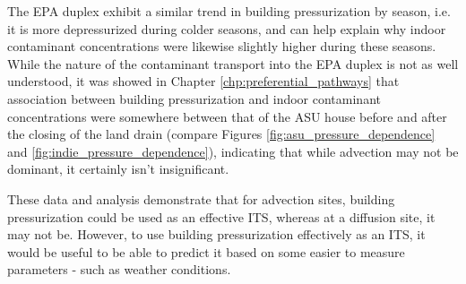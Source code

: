 The EPA duplex exhibit a similar trend in building pressurization by season, i.e. it is more depressurized during colder seasons, and can help explain why indoor contaminant concentrations were likewise slightly higher during these seasons.
While the nature of the contaminant transport into the EPA duplex is not as well understood, it was showed in Chapter \ref{chp:preferential_pathways} that association between building pressurization and indoor contaminant concentrations were somewhere between that of the ASU house before and after the closing of the land drain (compare Figures \ref{fig:asu_pressure_dependence} and \ref{fig:indie_pressure_dependence}), indicating that while advection may not be dominant, it certainly isn't insignificant.\par

These data and analysis demonstrate that for advection sites, building pressurization could be used as an effective ITS, whereas at a diffusion site, it may not be.
However, to use building pressurization effectively as an ITS, it would be useful to be able to predict it based on some easier to measure parameters - such as weather conditions.\par
